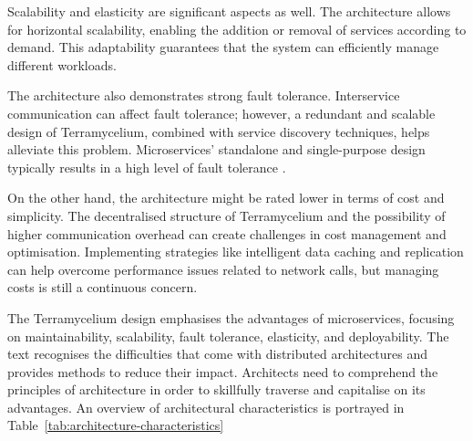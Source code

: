 \documentclass{ieeeaccess}
\begin{document}
Scalability and elasticity are significant aspects as well. The architecture allows for horizontal scalability, enabling the addition or removal of services according to demand. This adaptability guarantees that the system can efficiently manage different workloads.

The architecture also demonstrates strong fault tolerance. Interservice communication can affect fault tolerance; however, a redundant and scalable design of Terramycelium, combined with service discovery techniques, helps alleviate this problem. Microservices' standalone and single-purpose design typically results in a high level of fault tolerance \cite{MStodaytomorrow}.

On the other hand, the architecture might be rated lower in terms of cost and simplicity. The decentralised structure of Terramycelium and the possibility of higher communication overhead can create challenges in cost management and optimisation. Implementing strategies like intelligent data caching and replication can help overcome performance issues related to network calls, but managing costs is still a continuous concern.

The Terramycelium design emphasises the advantages of microservices, focusing on maintainability, scalability, fault tolerance, elasticity, and deployability. The text recognises the difficulties that come with distributed architectures and provides methods to reduce their impact. Architects need to comprehend the principles of architecture in order to skillfully traverse and capitalise on its advantages. An overview of architectural characteristics is portrayed in Table~\ref{tab:architecture-characteristics}
\end{document}
